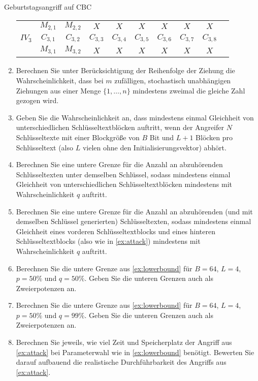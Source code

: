 \documentclass{article}
\begin{document}
\begin{exercise}{Geburtstagsangriff auf CBC}
\begin{enumerate}
\begin{center}
\begin{tabular}{c ccccccccc}
          & $M_{2,1}$ & $M_{2,2}$ & $X$ & $X$ & $X$ & $X$ & $X$ & $X$\vspace{.5em}\\
          $IV_3$ & $C_{3,1}$ & $C_{3,2}$ & $C_{3,3}$ & $C_{3,4}$ & $C_{3,5}$ & $C_{3,6}$ & $C_{3,7}$ & $C_{3,8}$\\
          & $M_{3,1}$ & $M_{3,2}$ &  $X$ & $X$ & $X$ & $X$ & $X$ & $X$\\
        \end{tabular}
      \end{center}
    \item Berechnen Sie unter Berücksichtigung der Reihenfolge der Ziehung die Wahrscheinlichkeit, dass bei $m$ zufälligen, stochastisch unabhängigen Ziehungen aus einer Menge $\{1, \ldots, n\}$ mindestens zweimal die gleiche Zahl gezogen wird.
    \item Geben Sie die Wahrscheinlichkeit an, dass mindestens einmal Gleichheit von unterschiedlichen Schlüsseltextblöcken auftritt, wenn der Angreifer $N$ Schlüsseltexte mit einer Blockgröße von $B$ Bit und $L + 1$ Blöcken pro Schlüsseltext (also $L$ vielen ohne den Initialisierungsvektor) abhört.
    \item Berechnen Sie eine untere Grenze für die Anzahl an abzuhörenden Schlüsseltexten unter demselben Schlüssel, sodass mindestens einmal Gleichheit von unterschiedlichen Schlüsseltextblöcken mindestens mit Wahrscheinlichkeit $q$ auftritt.
    \item\label{ex:lowerbound} Berechnen Sie eine untere Grenze für die Anzahl an abzuhörenden (und mit demselben Schlüssel generierten) Schlüsseltexten, sodass mindestens einmal Gleichheit eines vorderen Schlüsseltextblocks und eines hinteren Schlüsseltextblocks (also wie in \ref{ex:attack}) mindestens mit Wahrscheinlichkeit $q$ auftritt.
    \item Berechnen Sie die untere Grenze aus \ref{ex:lowerbound} für $B = 64$, $L = 4$, $p = 50\%$ und $q = 50\%$. Geben Sie die unteren Grenzen auch als Zweierpotenzen an.
    \item Berechnen Sie die untere Grenze aus \ref{ex:lowerbound} für $B = 64$, $L = 4$, $p = 50\%$ und $q = 99\%$. Geben Sie die unteren Grenzen auch als Zweierpotenzen an.
    \item Berechnen Sie jeweils, wie viel Zeit und Speicherplatz der Angriff aus \ref{ex:attack} bei Parameterwahl wie in \ref{ex:lowerbound} benötigt. Bewerten Sie darauf aufbauend die realistische Durchführbarkeit des Angriffs aus \ref{ex:attack}.
  \end{enumerate}


\end{exercise}
\end{document}
